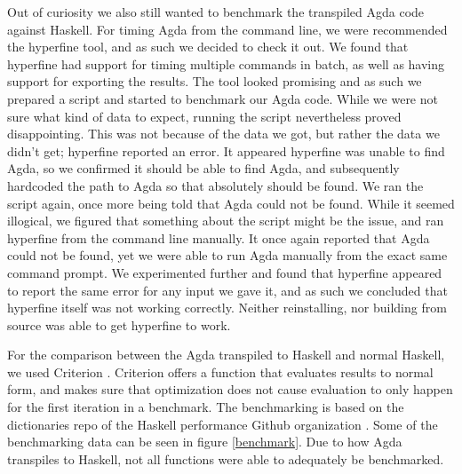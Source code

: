\documentclass[a4paper,UKenglish,cleveref, autoref, thm-restate]{template/lipics-v2021}
\begin{document}
Out of curiosity we also still wanted to benchmark the transpiled Agda code against Haskell. For timing Agda from the command line, we were recommended the hyperfine \cite{hyperfine} tool, and as such we decided to check it out. We found that hyperfine had support for timing multiple commands in batch, as well as having support for exporting the results. The tool looked promising and as such we prepared a script and started to benchmark our Agda code.\newline
While we were not sure what kind of data to expect, running the script nevertheless proved disappointing. This was not because of the data we got, but rather the data we didn't get; hyperfine reported an error. It appeared hyperfine was unable to find Agda, so we confirmed it should be able to find Agda, and subsequently hardcoded the path to Agda so that absolutely should be found. We ran the script again, once more being told that Agda could not be found.\newline
While it seemed illogical, we figured that something about the script might be the issue, and ran hyperfine from the command line manually. It once again reported that Agda could not be found, yet we were able to run Agda manually from the exact same command prompt. We experimented further and found that hyperfine appeared to report the same error for any input we gave it, and as such we concluded that hyperfine itself was not working correctly. Neither reinstalling, nor building from source was able to get hyperfine to work.
 
For the comparison between the Agda transpiled to Haskell and normal Haskell, we used Criterion \cite{criterion}. Criterion offers a function that evaluates results to normal form, and makes sure that optimization does not cause evaluation to only happen for the first iteration in a benchmark. The benchmarking is based on the dictionaries repo of the Haskell performance Github organization \cite{haskellperf}.\newline
Some of the benchmarking data can be seen in figure \ref{benchmark}.\newline
Due to how Agda transpiles to Haskell, not all functions were able to adequately be benchmarked.
\end{document}
